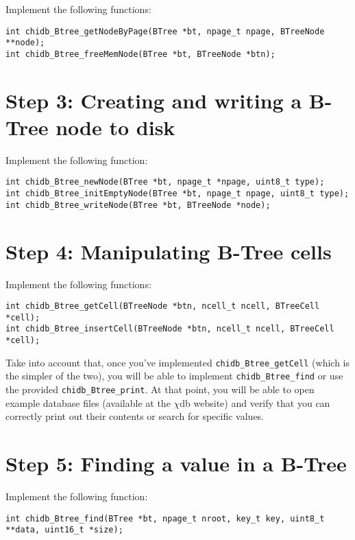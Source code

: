 \documentclass[10pt]{article}
\newcommand{\chidb}{$\chi$\textsf{db}}
\begin{document}
Implement the following functions:

\begin{verbatim}
int chidb_Btree_getNodeByPage(BTree *bt, npage_t npage, BTreeNode **node);
int chidb_Btree_freeMemNode(BTree *bt, BTreeNode *btn);
\end{verbatim}

\section*{Step 3: Creating and writing a B-Tree node to disk}

Implement the following function:

\begin{verbatim}
int chidb_Btree_newNode(BTree *bt, npage_t *npage, uint8_t type);
int chidb_Btree_initEmptyNode(BTree *bt, npage_t npage, uint8_t type);
int chidb_Btree_writeNode(BTree *bt, BTreeNode *node);
\end{verbatim}


\section*{Step 4: Manipulating B-Tree cells}

Implement the following functions:

\begin{verbatim}
int chidb_Btree_getCell(BTreeNode *btn, ncell_t ncell, BTreeCell *cell);
int chidb_Btree_insertCell(BTreeNode *btn, ncell_t ncell, BTreeCell *cell);
\end{verbatim}

Take into account that, once you've implemented \texttt{chidb\_Btree\_getCell} (which is the simpler of the two), you will be able to implement \texttt{chidb\_Btree\_find} or use the provided \texttt{chidb\_Btree\_print}. At that point, you will be able to open example database files (available at the \chidb{} website) and verify that you can correctly print out their contents or search for specific values.

\section*{Step 5: Finding a value in a B-Tree}

Implement the following function:

\begin{verbatim}
int chidb_Btree_find(BTree *bt, npage_t nroot, key_t key, uint8_t **data, uint16_t *size);
\end{verbatim}
\end{document}
